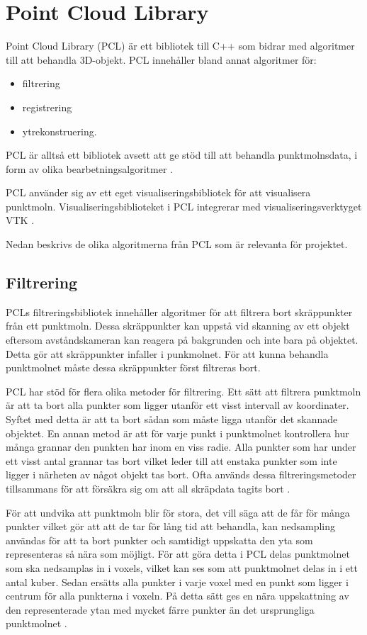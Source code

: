 \section{Point Cloud Library}

Point Cloud Library (PCL) är ett bibliotek till C++ som bidrar med algoritmer till att behandla 3D-objekt. PCL innehåller bland annat algoritmer för:

\begin{itemize}
	\item filtrering
	\item registrering
	\item ytrekonstruering.
\end{itemize}
PCL är alltså ett bibliotek avsett att ge stöd till att behandla punktmolnsdata, i form av olika bearbetningsalgoritmer \cite{rusu20113d}.

PCL använder sig av ett eget visualiseringsbibliotek för att visualisera punktmoln. Visualiseringsbiblioteket i PCL integrerar med visualiseringsverktyget VTK \cite{VTK_book}\cite{rusu20113d}.

Nedan beskrivs de olika algoritmerna från PCL som är relevanta för projektet.

\subsection{Filtrering}
PCLs filtreringsbibliotek innehåller algoritmer för att filtrera bort skräppunkter från ett punkt\-moln. Dessa skräppunkter kan uppstå vid skanning av ett objekt eftersom avståndskameran kan reagera på bakgrunden och inte bara på objektet. Detta gör att skräppunkter infaller i punkmolnet. För att kunna behandla punktmolnet måste dessa skräppunkter först filtreras bort.

PCL har stöd för flera olika metoder för filtrering. Ett sätt att filtrera punktmoln är att ta bort alla punkter som ligger utanför ett visst intervall av koordinater. Syftet med detta är att ta bort sådan som måste ligga utanför det skannade objektet. En annan metod är att för varje punkt i punktmolnet kontrollera hur många grannar den punkten har inom en viss radie. Alla punkter som har under ett visst antal grannar tas bort vilket leder till att enstaka punkter som inte ligger i närheten av något objekt tas bort. Ofta används dessa filtreringsmetoder tillsammans för att försäkra sig om att all skräpdata tagits bort \cite{pcl_filtering}.

För att undvika att punktmoln blir för stora, det vill säga att de får för många punkter vilket gör att att de tar för lång tid att behandla, kan nedsampling användas för att ta bort punkter och samtidigt uppskatta den yta som representeras så nära som möjligt. För att göra detta i PCL delas punktmolnet som ska nedsamplas in i voxels, vilket kan ses som att punktmolnet delas in i ett antal kuber. Sedan ersätts alla punkter i varje voxel med en punkt som ligger i centrum för alla punkterna i voxeln. På detta sätt ges en nära uppskattning av den representerade ytan med mycket färre punkter än det ursprungliga punktmolnet \cite{voxel_grid}.
 

